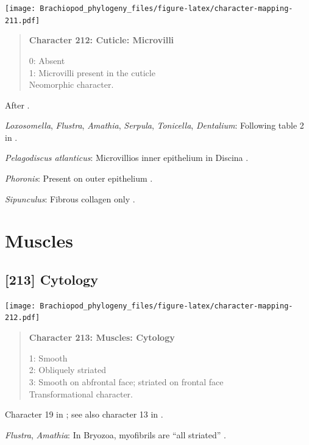 \documentclass[openany]{book}
\begin{document}
\texttt{[image: Brachiopod\_phylogeny\_files/figure-latex/character-mapping-211.pdf]}

\begin{quote}
\textbf{Character 212: Cuticle: Microvilli}

0: Absent\\
1: Microvilli present in the cuticle\\
Neomorphic character.
\end{quote}

After \citet{Borisanova2015}.

\hypertarget{Amathia-coding-212}{}
\emph{Loxosomella}, \emph{Flustra}, \emph{Amathia}, \emph{Serpula},
\emph{Tonicella}, \emph{Dentalium}: Following table 2 in
\citet{Borisanova2015}.

\hypertarget{Pelagodiscus_atlanticus-coding-212}{}
\emph{Pelagodiscus atlanticus}: Microvillios inner epithelium in Discina
\citep{Williams1997Introduction}.

\hypertarget{Phoronis-coding-212}{}
\emph{Phoronis}: Present on outer epithelium \citep{BereiterHahn1984}.

\hypertarget{Sipunculus-coding-212}{}
\emph{Sipunculus}: Fibrous collagen only \citep{BereiterHahn1984}.

\section{Muscles}\label{muscles}

\subsection*{{[}213{]} Cytology}\label{cytology}

\texttt{[image: Brachiopod\_phylogeny\_files/figure-latex/character-mapping-212.pdf]}

\begin{quote}
\textbf{Character 213: Muscles: Cytology}

1: Smooth\\
2: Obliquely striated\\
3: Smooth on abfrontal face; striated on frontal face\\
Transformational character.
\end{quote}

Character 19 in \citet{Haszprunar1996}; see also character 13 in
\citet{Haszprunar2000}.

\hypertarget{Amathia-coding-213}{}
\emph{Flustra}, \emph{Amathia}: In Bryozoa, myofibrils are ``all
striated'' \citep{Pardos1991}.
\end{document}
